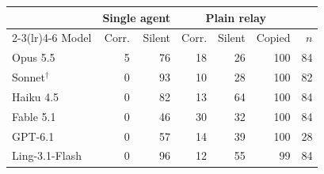 \begin{tabular}{lrrrrrr}
\toprule
 & \multicolumn{2}{c}{Single agent} & \multicolumn{3}{c}{Plain relay} & \\
\cmidrule(lr){2-3}\cmidrule(lr){4-6}
Model & Corr. & Silent & Corr. & Silent & Copied & $n$ \\
\midrule
Opus 5.5 & 5 & 76 & 18 & 26 & 100 & 84 \\
Sonnet$^\dagger$ & 0 & 93 & 10 & 28 & 100 & 82 \\
Haiku 4.5 & 0 & 82 & 13 & 64 & 100 & 84 \\
Fable 5.1 & 0 & 46 & 30 & 32 & 100 & 84 \\
GPT-6.1 & 0 & 57 & 14 & 39 & 100 & 28 \\
Ling-3.1-Flash & 0 & 96 & 12 & 55 & 99 & 84 \\
\bottomrule
\end{tabular}

